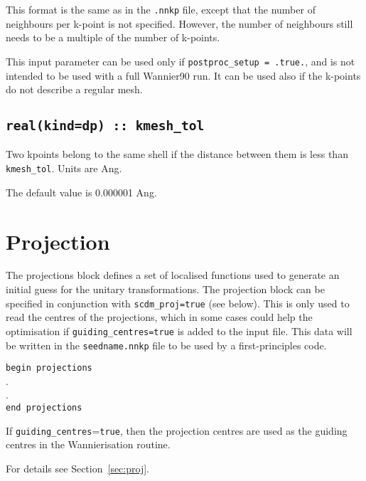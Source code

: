 This format is the same as in the \texttt{.nnkp} file, except that the number of neighbours per k-point is not specified. However, the number of neighbours still needs to be a multiple of the number of k-points.

This input parameter can be used only if \texttt{postproc\_setup = .true.}, and is not intended to be used with a full Wannier90 run. It can be used also if the k-points do not describe a regular mesh.

\subsection[kmesh\_tol]{\tt real(kind=dp) :: kmesh\_tol}

Two kpoints belong to the same shell if the distance between them is
less than {\tt kmesh\_tol}.
Units are Ang.

The default value is 0.000001 Ang.

\section{Projection}

 The projections block defines a set of localised functions used to
 generate an initial guess for the unitary transformations. The projection block can be specified
in conjunction with {\tt scdm\_proj=true} (see below). This is only used to read the centres of the projections, which in some cases could help the optimisation if {\tt guiding\_centres=true} is added to the input file.
This data will be written in the {\tt seedname.nnkp} file to be used
by a first-principles code.

\noindent \verb#begin projections# \\
  . \\
  . \\
\verb#end projections#

If \verb#guiding_centres#={\tt true}, then the projection centres are
used as the guiding centres in the Wannierisation routine.

For details see Section~\ref{sec:proj}.

